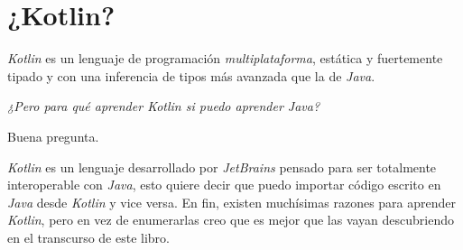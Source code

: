 \section{¿Kotlin?}
  \textit{Kotlin} es un lenguaje de programación \textit{multiplataforma}, estática y fuertemente
  tipado y con una inferencia de tipos más avanzada que la de \textit{Java}.

  \begin{center}
    \textit{¿Pero para qué aprender Kotlin si puedo aprender Java?}
  \end{center}

  Buena pregunta.
  \vfill
  \newpage

  \textit{Kotlin} es un lenguaje desarrollado por \textit{JetBrains} pensado para ser totalmente 
  interoperable con \textit{Java}, esto quiere decir que puedo importar código escrito en 
  \textit{Java} desde \textit{Kotlin} y vice versa.
  En fin, existen muchísimas razones para aprender \textit{Kotlin}, pero en vez de enumerarlas creo
  que es mejor que las vayan descubriendo en el transcurso de este libro.

